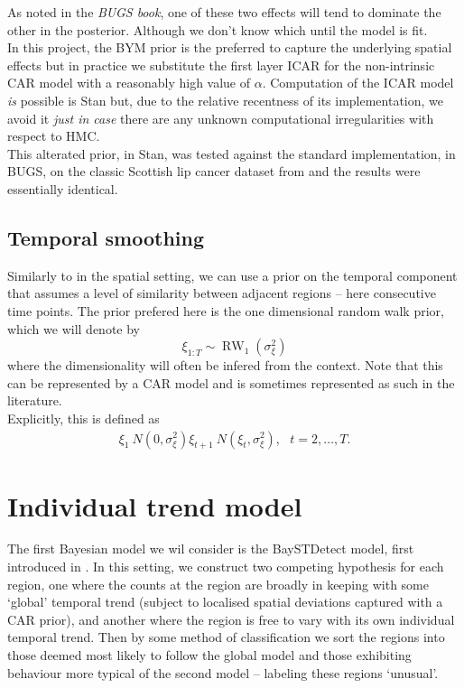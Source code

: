 \documentclass[11pt]{report}
\begin{document}
As noted in the \emph{BUGS book}, one of these two effects will tend to dominate the other in the posterior. Although we don't know which until the model is fit. \\

In this project, the BYM prior is the preferred to capture the underlying spatial effects but in practice we substitute the first layer ICAR for the non-intrinsic CAR model with a reasonably high value of $\alpha$. Computation of the ICAR model \emph{is} possible is Stan \citep{car} but, due to the relative recentness of its implementation, we avoid it \emph{just in case} there are any unknown computational irregularities with respect to HMC. \\

This alterated prior, in Stan, was tested against the standard implementation, in BUGS, on the classic Scottish lip cancer dataset from \citet{lipcancer} and the results were essentially identical.   

\section{Temporal smoothing}

Similarly to in the spatial setting, we can use a prior on the temporal component that assumes a level of similarity between adjacent regions -- here consecutive time points. The prior prefered here is the one dimensional random walk prior, which we will denote by
\begin{equation}
\xi_{1:T} \sim \operatorname{RW}_1(\sigma_\xi^2)
\end{equation}
where the dimensionality will often be infered from the context. Note that this can be represented by a CAR model and is sometimes represented as such in the literature. \\

Explicitly, this is defined as
\begin{gather}
\xi_1 ~ N(0, \sigma_\xi^2) 
\xi_{t+1} ~ N(\xi_{t}, \sigma_{\xi}^2), \ \ \ t = 2, \ldots, T.
\end{gather}

\chapter{Individual trend model}

The first Bayesian model we wil consider is the BaySTDetect model, first introduced in \citet{baystdetect}. In this setting, we construct two competing hypothesis for each region, one where the counts at the region are broadly in keeping with some `global' temporal trend (subject to localised spatial deviations captured with a CAR prior), and another where the region is free to vary with its own individual temporal trend. Then by some method of classification we sort the regions into those deemed most likely to follow the global model and those exhibiting behaviour more typical of the second model -- labeling these regions `unusual'. \\
\end{document}
